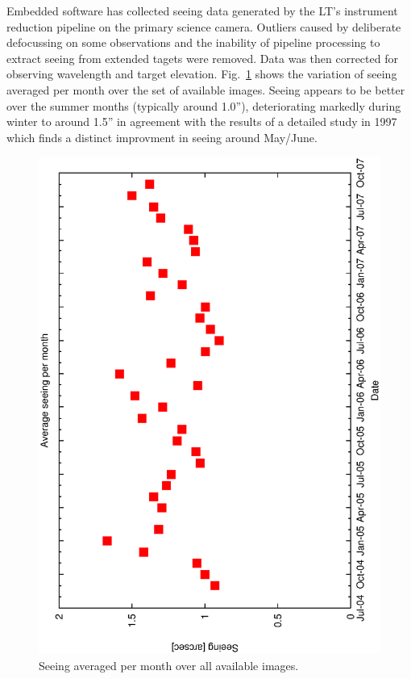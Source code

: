 \documentclass[12pt,a4paper]{article}
\begin{document}
{Embedded software has collected seeing data generated by the LT's instrument reduction pipeline on the primary science camera. Outliers caused by deliberate defocussing on some observations and the inability of pipeline processing to extract seeing from extended tagets were removed. Data was then corrected for observing wavelength and target elevation. Fig.~\ref{fig:monthly_seeing} shows the variation of seeing averaged per month over the set of available images. Seeing appears to be better over the summer months (typically around 1.0''), deteriorating markedly during winter to around 1.5'' in agreement with the results of a detailed study in 1997 \citep{munoz97nighttime} which finds a distinct improvment in seeing around May/June. 

\begin{figure}[htbp]
\begin{center}
    \includegraphics[scale=0.4, angle=-90]{figures/ecs/corr_see_monthly.eps}
\end{center} 
\caption[Corrected seeing averaged per month over available images.]
{Seeing averaged per month over all available images.}
\label{fig:monthly_seeing}
\end{figure}


}
\end{document}
